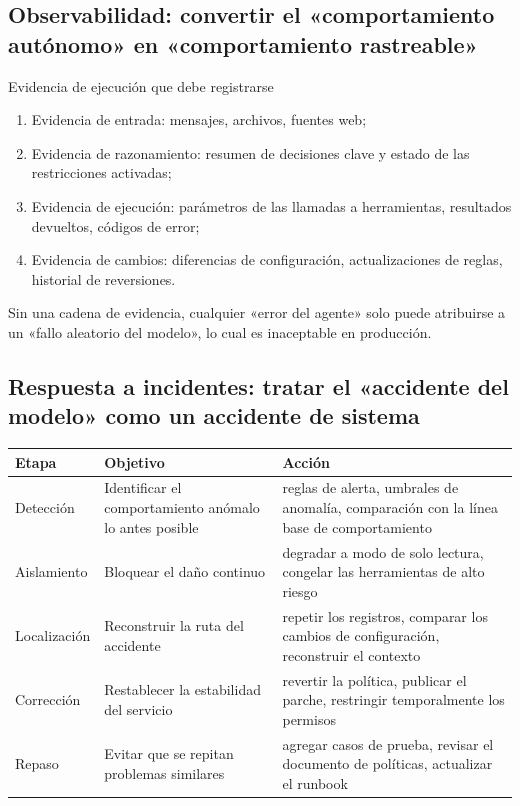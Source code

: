 \documentclass[a4paper]{article}
\begin{document}
\subsection{Observabilidad: convertir el «comportamiento autónomo» en «comportamiento rastreable»}

\begin{importantbox}{Evidencia de ejecución que debe registrarse}
\begin{enumerate}
    \item Evidencia de entrada: mensajes, archivos, fuentes web;
    \item Evidencia de razonamiento: resumen de decisiones clave y estado de las restricciones activadas;
    \item Evidencia de ejecución: parámetros de las llamadas a herramientas, resultados devueltos, códigos de error;
    \item Evidencia de cambios: diferencias de configuración, actualizaciones de reglas, historial de reversiones.
\end{enumerate}
\end{importantbox}

Sin una cadena de evidencia, cualquier «error del agente» solo puede atribuirse a un «fallo aleatorio del modelo», lo cual es inaceptable en producción.

\subsection{Respuesta a incidentes: tratar el «accidente del modelo» como un accidente de sistema}

\begin{longtable}{p{}p{}p{}}
\toprule
\textbf{Etapa} & \textbf{Objetivo} & \textbf{Acción} \\
\midrule
Detección & Identificar el comportamiento anómalo lo antes posible & reglas de alerta, umbrales de anomalía, comparación con la línea base de comportamiento \\
\midrule
Aislamiento & Bloquear el daño continuo & degradar a modo de solo lectura, congelar las herramientas de alto riesgo \\
\midrule
Localización & Reconstruir la ruta del accidente & repetir los registros, comparar los cambios de configuración, reconstruir el contexto \\
\midrule
Corrección & Restablecer la estabilidad del servicio & revertir la política, publicar el parche, restringir temporalmente los permisos \\
\midrule
Repaso & Evitar que se repitan problemas similares & agregar casos de prueba, revisar el documento de políticas, actualizar el runbook \\
\bottomrule
\end{longtable}
\end{document}

